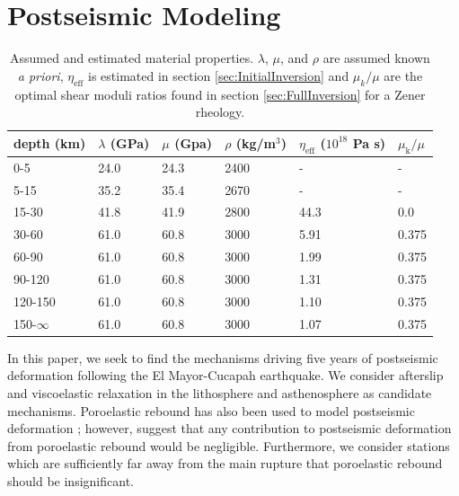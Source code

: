 \documentclass[1p]{elsarticle}
\begin{document}
\section{Postseismic Modeling}\label{sec:Model}

\begin{table}\label{tab:MaterialProperties}
\begin{tabular} {l l l l l l}
depth (km) &$\lambda$ (GPa)&$\mu$ (Gpa)&$\rho$ (kg/m$^3$)&$\eta_\mathrm{eff}$ ($10^{18}$ Pa s) & $\mu_\mathrm{k}/\mu$\\ \hline
0-5 & 24.0 & 24.3 & 2400 & - & -\\
5-15 & 35.2 & 35.4 & 2670 & - & -\\
15-30 & 41.8 & 41.9 & 2800 & 44.3 & 0.0\\
30-60 & 61.0 & 60.8 & 3000 & 5.91 & 0.375\\
60-90 & 61.0 & 60.8 & 3000 & 1.99 & 0.375\\
90-120 & 61.0 & 60.8 & 3000 & 1.31 & 0.375\\
120-150 & 61.0 & 60.8 & 3000 & 1.10 & 0.375\\
150-$\infty$ & 61.0 & 60.8 & 3000 & 1.07 & 0.375\\
\end{tabular}
\caption{Assumed and estimated material properties. $\lambda$, $\mu$, and $\rho$ are assumed known \textit{a priori}, $\eta_\mathrm{eff}$ is estimated in section \ref{sec:InitialInversion} and $\mu_k/\mu$ are the optimal shear moduli ratios found in section \ref{sec:FullInversion} for a Zener rheology.} 

\end{table}
In this paper, we seek to find the mechanisms driving five years of postseismic deformation following the El Mayor-Cucapah earthquake. We consider afterslip and viscoelastic relaxation in the lithosphere and asthenosphere as candidate mechanisms.  Poroelastic rebound has also been used to model postseismic deformation \citep[e.g.][]{Jonsson2003}; however, \citet{Gonzalez-ortega2014} suggest that any contribution to postseismic deformation from poroelastic rebound would be negligible. Furthermore, we consider stations which are sufficiently far away from the main rupture that poroelastic rebound should be insignificant.  
\end{document}
